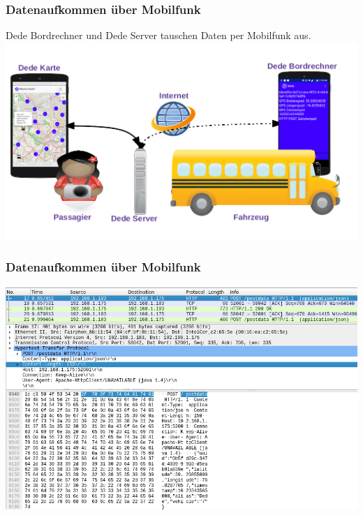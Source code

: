 
\begin{frame}
  \frametitle{Datenaufkommen über Mobilfunk}
  Dede Bordrechner und Dede Server tauschen Daten per Mobilfunk aus.
  \includegraphics[width=\paperwidth]{dede/dede-concept}
\end{frame}

\begin{frame}
  \frametitle{Datenaufkommen über Mobilfunk}
  \includegraphics[width=0.88\paperwidth]{dede/dede-obc-wireshark-http-post}
\end{frame}

